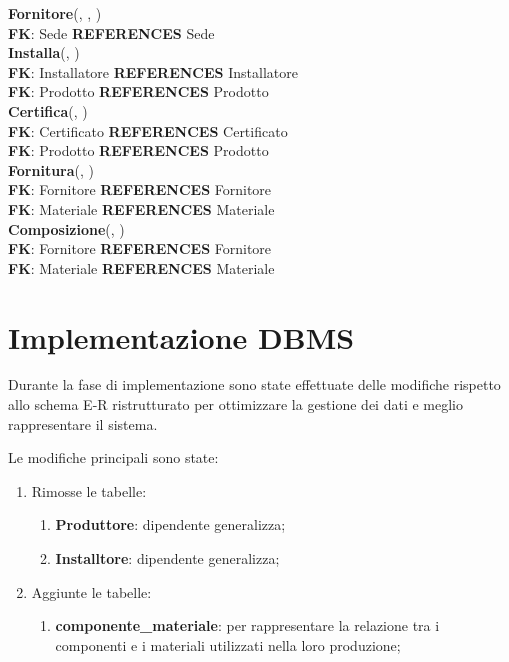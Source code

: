 \documentclass{article}
\begin{document}
\textbf{Fornitore}(\underline{}, , )\\
\indent\indent \textbf{FK}: Sede \textbf{REFERENCES} Sede\\

\textbf{Installa}(\underline{}, )\\
\indent\indent \textbf{FK}: Installatore \textbf{REFERENCES} Installatore\\
\indent\indent \textbf{FK}: Prodotto \textbf{REFERENCES} Prodotto\\

\textbf{Certifica}(\underline{}, )\\
\indent\indent \textbf{FK}: Certificato \textbf{REFERENCES} Certificato\\
\indent\indent \textbf{FK}: Prodotto \textbf{REFERENCES} Prodotto\\

\textbf{Fornitura}(\underline{}, )\\
\indent\indent \textbf{FK}: Fornitore \textbf{REFERENCES} Fornitore\\
\indent\indent \textbf{FK}: Materiale \textbf{REFERENCES} Materiale\\

\textbf{Composizione}(\underline{}, )\\
\indent\indent \textbf{FK}: Fornitore \textbf{REFERENCES} Fornitore\\
\indent\indent \textbf{FK}: Materiale \textbf{REFERENCES} Materiale\\


\section{Implementazione DBMS}
Durante la fase di implementazione sono state effettuate delle modifiche rispetto allo schema E-R ristrutturato per ottimizzare la gestione dei dati e meglio rappresentare il
sistema.

Le modifiche principali sono state:
\begin{enumerate}
    \item Rimosse le tabelle:
    \begin{enumerate}
        \item \textbf{Produttore}: dipendente generalizza;
        \item \textbf{Installtore}: dipendente generalizza;
    \end{enumerate}

    \item Aggiunte le tabelle:
    \begin{enumerate}
        \item \textbf{componente\_materiale}: per rappresentare la relazione tra i componenti e i materiali utilizzati nella loro produzione;
    \end{enumerate}
\end{enumerate}
\end{document}
